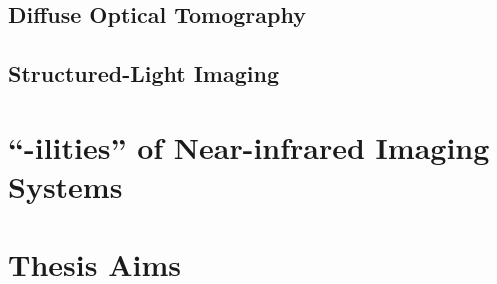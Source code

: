 \subsection{Diffuse Optical Tomography}
\subsection{Structured-Light Imaging}



\section{``-ilities'' of Near-infrared Imaging Systems}
\label{chap:background:ilities}



\section{Thesis Aims}
\label{chap:background:aims}


